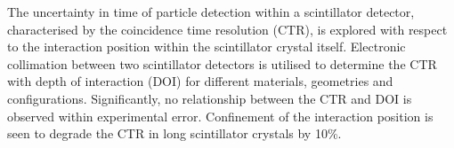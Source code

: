 The uncertainty in time of particle detection within a scintillator detector, characterised by the coincidence time resolution (CTR), is explored with respect to the interaction position within the scintillator crystal itself. Electronic collimation between two scintillator detectors is utilised to determine the CTR with depth of interaction (DOI) for different materials, geometries and configurations. Significantly, no relationship between the CTR and DOI is observed within experimental error. Confinement of the interaction position is seen to degrade the CTR in long scintillator crystals by 10\%.